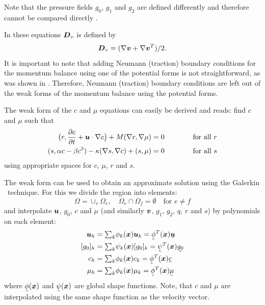 Note that the pressure fields $g_0$, $g_1$ and $g_2$ are defined differently 
and therefore cannot be compared directly 
\cite{Jaensson2015}. 

In these equations
$\boldsymbol{D}_v$ is defined by
\[
\boldsymbol{D}_v=(\nabla\boldsymbol{v}+\nabla\boldsymbol{v}^T)/2.
\]
It is important to note that adding Neumann (traction) boundary conditions for 
the momentum balance 
using one of the potential forms is not straightforward, as was shown in 
\cite{Jaensson2015}. Therefore, Neumann (traction) boundary conditions are left 
out of the weak forms of the momentum balance using the potential forms.

The weak form of the $c$ and $\mu$ equations can easily be derived and reads:
find $c$ and $\mu$ such that
\begin{alignat*}{3}
\big(r,\dfrac{\partial c}{\partial t}+\boldsymbol{u}\cdot\nabla c\big)+M(\nabla r,\nabla \mu)
&=0 &&\qquad&\text{for all } r\\
(s, \alpha c-\beta c^3)-\kappa(\nabla s,\nabla c) +(s,\mu) &=0
&&\qquad&\text{for all } s
\end{alignat*}
using appropriate spaces for $c$, $\mu$, $r$ and $s$.


The weak form can be used to obtain an approximate solution using the Galerkin 
\fem\
technique. For this we divide the region into elements:
\[
\Omega=\cup_e\Omega_e, \quad\Omega_{e}\cap\Omega_{f}=\emptyset\quad
\text{for }e\neq f
\]
and interpolate $\boldsymbol{u}$, $g_0$, $c$ and $\mu$
(and similarly $\boldsymbol{v}$, $g_1$, $g_2$, $q$, $r$ and $s$) by polynomials on each 
element:
\[
\begin{split}
\vek u_h&=\tsum_k \phi_k(\vek x)\vek u_k=\col\phi^T(\vek x)\col{\vek u}\\
[g_0]_h&=\tsum_k \psi_k(\vek x) [g_0]_k=\col\psi^T(\vek x)\col{g_0}\\
c_h&=\tsum_k \phi_k(\vek x) c_k=\col\phi^T(\vek x)\col{ c}\\
\mu_h&=\tsum_k \phi_k(\vek x) \mu_k=\col\phi^T(\vek x)\col{ \mu}
\end{split}
\]
where $\col\phi(\vek x)$ and $\col\psi(\vek x)$
are global shape functions. Note, that $c$ and $\mu$ are interpolated using the
same shape function as the velocity vector.

